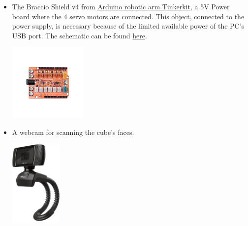 \documentclass{report}
\begin{document}
\begin{itemize}
     \item The Braccio Shield v4 from \href{https://store.arduino.cc/products/tinkerkit-braccio-robot?srsltid=AfmBOoqExbUeCwcXCfRaFAXlicvBgPllll6ozcArsreP7fObxQhmhGch}{Arduino robotic arm Tinkerkit}, a 5V Power board where the 4 servo motors are connected. This object, connected to the power supply, is necessary because of the limited available power of the PC's USB port. The schematic can be found \href{https://content.arduino.cc/assets/Braccio-Shield-V1.pdf}{here}.

        \begin{center}
        \includegraphics[width=0.3\textwidth]{images/Requirements/arduino_braccio_shield_no_bg.png}
        \end{center}

    \item A webcam for scanning the cube's faces.

        \begin{center}
        \includegraphics[width=0.2\textwidth]{images/Requirements/webcam_no_bg.png}
        \end{center}
        
\end{itemize}
\end{document}
